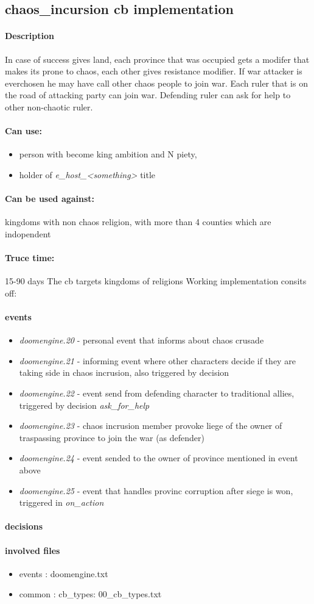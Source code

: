 \documentclass[10pt, english]{article}
\begin{document}
\newpage
\subsection{chaos\_incursion cb implementation}
\paragraph{Description}
In case of success gives land, each province that was occupied gets a modifer that 
makes its prone to chaos, each other gives resistance modifier.
If war attacker is everchosen he may have call other chaos  people to join war.
Each ruler that is on the road of attacking party can join war.
Defending ruler can ask for help to other non-chaotic ruler.
\paragraph{Can use:} 
\begin{itemize}
 \item person with become king ambition and N piety,
 \item holder of \textit{e\_host\_<something>}  title
\end{itemize}
\paragraph{Can be used against:}
kingdoms with non chaos religion, with more than 4 counties which are indopendent
\paragraph{Truce time:} 15-90 days
The cb targets kingdoms of religions 
Working implementation consits off:
\paragraph{events}
\begin{itemize}
\item \textit{doomengine.20} - personal event that informs about chaos crusade 
\item \textit{doomengine.21} - informing event where other characters decide
 if they are taking side in chaos incrusion, also triggered by decision
\item \textit{doomengine.22} - event send from defending character to traditional allies,
triggered by decision \textit{ask\_for\_help}
\item \textit{doomengine.23} - chaos incrusion member provoke liege of 
the owner of traspassing province to join the war (as defender)
\item \textit{doomengine.24} - event sended to the owner of province mentioned in event
above
\item \textit{doomengine.25} - event that handles provinc corruption after siege is won,
triggered in \textit{on\_action}
\end{itemize}
\paragraph{decisions}

\paragraph{involved files}
\begin{itemize}
\item  events : doomengine.txt
\item common : cb\_types: 00\_cb\_types.txt
\end{itemize}
\end{document}
